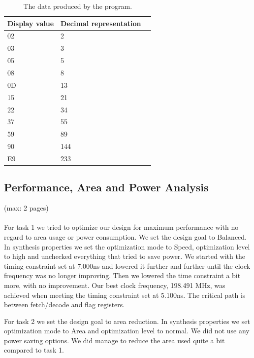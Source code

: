 \documentclass[a4,11pt]{article}
\begin{document}
\begin{table}   
	\centering
	\small
	\def\arraystretch{1.1}              
	\begin{tabular}{|l|l|l|}
		\hline
		Display value & Decimal representation \\ \hline
		02  & 2                                \\
    03  & 3                                \\
    05  & 5                                \\
    08  & 8                                \\
    0D  & 13                               \\
    15  & 21                               \\
    22  & 34                               \\
    37  & 55                               \\
    59  & 89                               \\
    90  & 144                              \\    
    E9  & 233                              \\ \hline
	\end{tabular}
	\caption{The data produced by the program.}
	\label{tab:fib_data}
\end{table}

\subsection{Performance, Area and Power Analysis}
(max: 2 pages)
\\\\
For task 1 we tried to optimize our design for maximum performance with no regard to area usage or power consumption. We set the design goal to Balanced. In synthesis properties we set the optimization mode to Speed, optimization level to high and unchecked everything that tried to save power. We started with the timing constraint set at 7.000ns and lowered it further and further until the clock frequency was no longer improving. Then we lowered the time constraint a bit more, with no improvement. Our best clock frequency, 198.491 MHz, was achieved when meeting the timing constraint set at 5.100ns. The critical path is between fetch/decode and flag registers.

For task 2 we set the design goal to area reduction. In synthesis properties we set optimization mode to Area and optimization level to normal. We did not use any power saving options. We did manage to reduce the area used quite a bit compared to task 1. 
\end{document}
